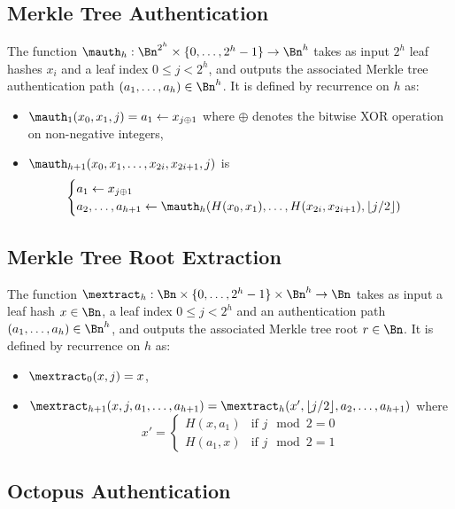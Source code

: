 \subsection{Merkle Tree Authentication}

The function $\mauth_h : \Bn^{2^h} \times \{0, \ldots, 2^h-1\} \to \Bn^h$ takes as input $2^h$ leaf hashes $x_i$ and a leaf index $0 \le j < 2^h$, and outputs the associated Merkle tree authentication path $(a_1, \ldots, a_h) \in \Bn^h$.
It is defined by recurrence on $h$ as:

\begin{itemize}
\item $\mauth_1(x_0, x_1, j) = a_1 \gets x_{j \oplus 1}$ where $\oplus$ denotes the bitwise XOR operation on non-negative integers,
\item $\mauth_{h+1}(x_0, x_1, \ldots, x_{2i}, x_{2i+1}, j)$ is \[\begin{cases}
        a_1 \gets x_{j \oplus 1} \\
        a_2, \ldots, a_{h+1} \gets \mauth_h(H(x_0, x_1), \ldots, H(x_{2i}, x_{2i+1}), \lfloor j/2 \rfloor)
    \end{cases}\]
\end{itemize}

\subsection{Merkle Tree Root Extraction}

The function $\mextract_h : \Bn \times \{0, \ldots, 2^h-1\} \times \Bn^h \to \Bn$ takes as input a leaf hash $x \in \Bn$, a leaf index $0 \le j < 2^h$ and an authentication path $(a_1, \ldots, a_h) \in \Bn^h$, and outputs the associated Merkle tree root $r \in \Bn$.
It is defined by recurrence on $h$ as:

\begin{itemize}
\item $\mextract_0(x, j) = x$,
\item $\mextract_{h+1}(x, j, a_1, \ldots, a_{h+1}) = \mextract_h(x', \lfloor j/2 \rfloor, a_2, \ldots, a_{h+1})$ where \[x' = \begin{cases}H(x, a_1) & \text{if } j \mod 2 = 0 \\ H(a_1, x) & \text{if } j \mod 2 = 1\end{cases}\]
\end{itemize}

\subsection{Octopus Authentication}

